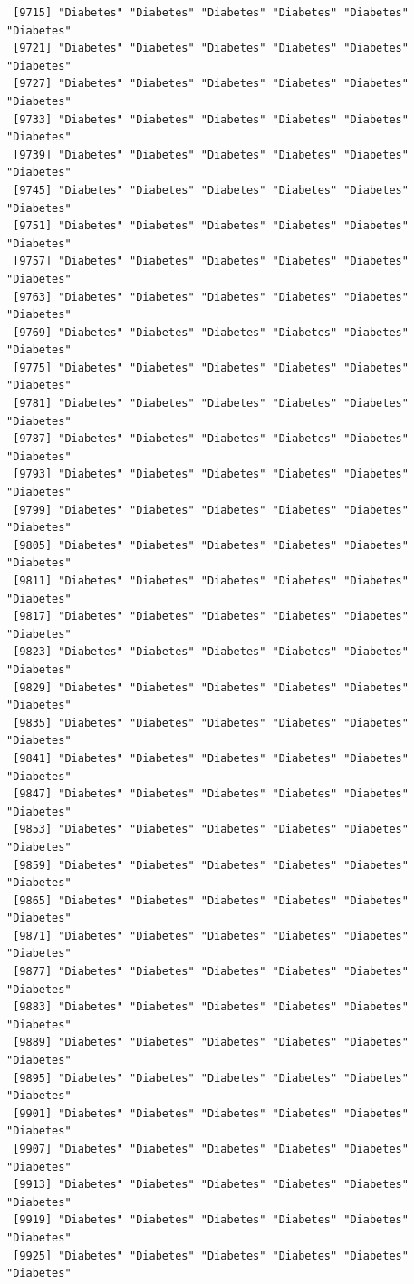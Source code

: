 \documentclass[
  letterpaper,
  DIV=11,
  numbers=noendperiod]{scrartcl}
\begin{document}
\begin{verbatim}
 [9715] "Diabetes" "Diabetes" "Diabetes" "Diabetes" "Diabetes" "Diabetes"
 [9721] "Diabetes" "Diabetes" "Diabetes" "Diabetes" "Diabetes" "Diabetes"
 [9727] "Diabetes" "Diabetes" "Diabetes" "Diabetes" "Diabetes" "Diabetes"
 [9733] "Diabetes" "Diabetes" "Diabetes" "Diabetes" "Diabetes" "Diabetes"
 [9739] "Diabetes" "Diabetes" "Diabetes" "Diabetes" "Diabetes" "Diabetes"
 [9745] "Diabetes" "Diabetes" "Diabetes" "Diabetes" "Diabetes" "Diabetes"
 [9751] "Diabetes" "Diabetes" "Diabetes" "Diabetes" "Diabetes" "Diabetes"
 [9757] "Diabetes" "Diabetes" "Diabetes" "Diabetes" "Diabetes" "Diabetes"
 [9763] "Diabetes" "Diabetes" "Diabetes" "Diabetes" "Diabetes" "Diabetes"
 [9769] "Diabetes" "Diabetes" "Diabetes" "Diabetes" "Diabetes" "Diabetes"
 [9775] "Diabetes" "Diabetes" "Diabetes" "Diabetes" "Diabetes" "Diabetes"
 [9781] "Diabetes" "Diabetes" "Diabetes" "Diabetes" "Diabetes" "Diabetes"
 [9787] "Diabetes" "Diabetes" "Diabetes" "Diabetes" "Diabetes" "Diabetes"
 [9793] "Diabetes" "Diabetes" "Diabetes" "Diabetes" "Diabetes" "Diabetes"
 [9799] "Diabetes" "Diabetes" "Diabetes" "Diabetes" "Diabetes" "Diabetes"
 [9805] "Diabetes" "Diabetes" "Diabetes" "Diabetes" "Diabetes" "Diabetes"
 [9811] "Diabetes" "Diabetes" "Diabetes" "Diabetes" "Diabetes" "Diabetes"
 [9817] "Diabetes" "Diabetes" "Diabetes" "Diabetes" "Diabetes" "Diabetes"
 [9823] "Diabetes" "Diabetes" "Diabetes" "Diabetes" "Diabetes" "Diabetes"
 [9829] "Diabetes" "Diabetes" "Diabetes" "Diabetes" "Diabetes" "Diabetes"
 [9835] "Diabetes" "Diabetes" "Diabetes" "Diabetes" "Diabetes" "Diabetes"
 [9841] "Diabetes" "Diabetes" "Diabetes" "Diabetes" "Diabetes" "Diabetes"
 [9847] "Diabetes" "Diabetes" "Diabetes" "Diabetes" "Diabetes" "Diabetes"
 [9853] "Diabetes" "Diabetes" "Diabetes" "Diabetes" "Diabetes" "Diabetes"
 [9859] "Diabetes" "Diabetes" "Diabetes" "Diabetes" "Diabetes" "Diabetes"
 [9865] "Diabetes" "Diabetes" "Diabetes" "Diabetes" "Diabetes" "Diabetes"
 [9871] "Diabetes" "Diabetes" "Diabetes" "Diabetes" "Diabetes" "Diabetes"
 [9877] "Diabetes" "Diabetes" "Diabetes" "Diabetes" "Diabetes" "Diabetes"
 [9883] "Diabetes" "Diabetes" "Diabetes" "Diabetes" "Diabetes" "Diabetes"
 [9889] "Diabetes" "Diabetes" "Diabetes" "Diabetes" "Diabetes" "Diabetes"
 [9895] "Diabetes" "Diabetes" "Diabetes" "Diabetes" "Diabetes" "Diabetes"
 [9901] "Diabetes" "Diabetes" "Diabetes" "Diabetes" "Diabetes" "Diabetes"
 [9907] "Diabetes" "Diabetes" "Diabetes" "Diabetes" "Diabetes" "Diabetes"
 [9913] "Diabetes" "Diabetes" "Diabetes" "Diabetes" "Diabetes" "Diabetes"
 [9919] "Diabetes" "Diabetes" "Diabetes" "Diabetes" "Diabetes" "Diabetes"
 [9925] "Diabetes" "Diabetes" "Diabetes" "Diabetes" "Diabetes" "Diabetes"

\end{verbatim}
\end{document}
